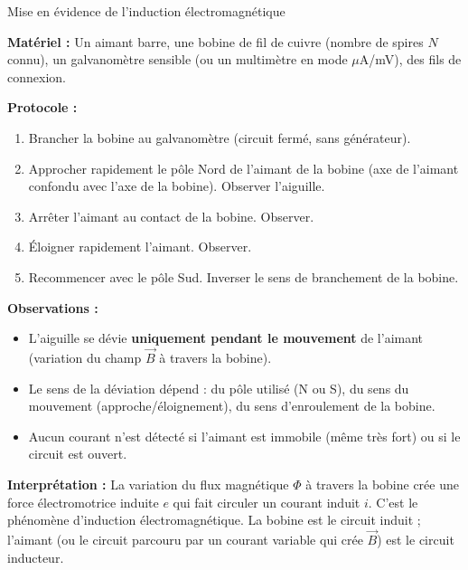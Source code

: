 \documentclass[11pt]{article}
\newcommand{\cle}[1]{{\popxbold\color{popdark}#1}}
\begin{document}
\begin{experience}Mise en évidence de l'induction électromagnétique\end{experience}

\textbf{Matériel :} Un aimant barre, une bobine de fil de cuivre (nombre de spires $N$ connu), un galvanomètre sensible (ou un multimètre en mode $\mu$A/mV), des fils de connexion.

\textbf{Protocole :}
\begin{enumerate}
\item Brancher la bobine au galvanomètre (circuit fermé, sans générateur).
\item Approcher rapidement le pôle Nord de l'aimant de la bobine (axe de l'aimant confondu avec l'axe de la bobine). Observer l'aiguille.
\item Arrêter l'aimant au contact de la bobine. Observer.
\item Éloigner rapidement l'aimant. Observer.
\item Recommencer avec le pôle Sud. Inverser le sens de branchement de la bobine.
\end{enumerate}

\textbf{Observations :}
\begin{itemize}
\item L'aiguille se dévie \textbf{uniquement pendant le mouvement} de l'aimant (variation du champ $\vec{B}$ à travers la bobine).
\item Le sens de la déviation dépend : du pôle utilisé (N ou S), du sens du mouvement (approche/éloignement), du sens d'enroulement de la bobine.
\item Aucun courant n'est détecté si l'aimant est immobile (même très fort) ou si le circuit est ouvert.
\end{itemize}

\textbf{Interprétation :} La variation du flux magnétique $\Phi$ à travers la bobine crée une \cle{force électromotrice induite} $e$ qui fait circuler un \cle{courant induit} $i$. C'est le phénomène d'\cle{induction électromagnétique}. La bobine est le \cle{circuit induit} ; l'aimant (ou le circuit parcouru par un courant variable qui crée $\vec{B}$) est le \cle{circuit inducteur}.
\end{document}
